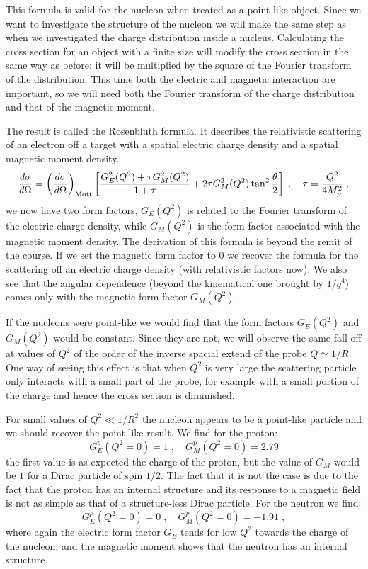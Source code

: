 \documentclass[12pt]{article}
\begin{document}
This formula is valid for the nucleon when treated as a point-like object. Since we want to investigate the structure of the nucleon we will make the same step as when we investigated the charge distribution inside a nucleus. Calculating the cross section for an object with a finite size will modify the cross section in the same way as before: it will be multiplied by the square of the Fourier transform of the distribution. This time both the electric and magnetic interaction are important, so we will need both the Fourier transform of the charge distribution and that of the magnetic moment.

The result is called the Rosenbluth formula. It describes the relativistic scattering of an electron off a target with a spatial electric charge density and a spatial magnetic moment density.
\[\frac{d\sigma}{d\Omega}=\left(\frac{d\sigma}{d\Omega}\right)_{\rm  Mott} \left[\frac{G^2_E(Q^2)+\tau G^2_M(Q^2)}{1+\tau}+2\tau G^2_M(Q^2)\tan^2\frac{\theta}{2}\right]\;,\quad \tau=\frac{Q^2}{4M^2_p}\;,\]
we now have two form factors, $G_E(Q^2)$ is related to the Fourier transform of the electric charge density, while $G_M(Q^2)$ is the form factor associated with the magnetic moment density. The derivation of this formula is beyond the remit of the course. If we set the magnetic form factor to $0$ we recover the formula for the scattering off an electric charge density (with relativistic factors now). We also see that the angular dependence (beyond the kinematical one brought by $1/q^4$) comes only with the magnetic form factor $G_M(Q^2)$.

If the nucleons were point-like we would find that the form factors $G_E(Q^2)$ and $G_M(Q^2)$ would be constant. Since they are not, we will observe the same fall-off at values of $Q^2$ of the order of the inverse spacial extend of the probe $Q\simeq 1/R$. One way of seeing this effect is that when $Q^2$ is very large the scattering particle only interacts with a small part of the probe, for example with a small portion of the charge and hence the cross section is diminished.

For small values of $Q^2\ll 1/R^2$ the nucleon appears to be a point-like particle and we should recover the point-like result. We find for the proton:
\[G_E^p(Q^2=0)=1\;,\quad G_M^p(Q^2=0)=2.79\]
the first value is as expected the charge of the proton, but the value of $G_M$ would be $1$ for a Dirac particle of spin $1/2$. The fact that it is not the case is due to the fact that the proton has an internal structure and its response to a magnetic field is not as simple as that of a structure-less Dirac particle. For the neutron we find:
\[G_E^p(Q^2=0)=0\;,\quad G_M^p(Q^2=0)=-1.91\;,\] 
where again the electric form factor $G_E$ tends for low $Q^2$ towards the charge of the nucleon, and the magnetic moment shows that the neutron has an internal structure. 
\end{document}
